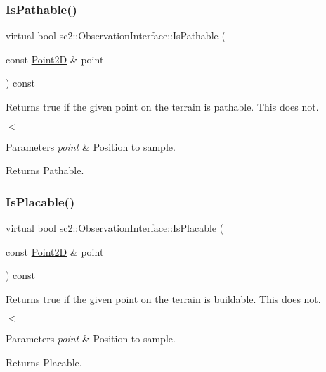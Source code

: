 \subsubsection{\texorpdfstring{Is\+Pathable()}{IsPathable()}}
{\footnotesize\ttfamily virtual bool sc2\+::\+Observation\+Interface\+::\+Is\+Pathable (\begin{DoxyParamCaption}\item[{const \hyperlink{structsc2_1_1_point2_d}{Point2D} \&}]{point }\end{DoxyParamCaption}) const\hspace{0.3cm}{\ttfamily [pure virtual]}}



Returns \textquotesingle{}true\textquotesingle{} if the given point on the terrain is pathable. This does not. 

$<$ 
\begin{DoxyParams}{Parameters}
{\em point} & Position to sample. \\
\hline
\end{DoxyParams}
\begin{DoxyReturn}{Returns}
Pathable. 
\end{DoxyReturn}
\mbox{\label{classsc2_1_1_observation_interface_aceb3be53ab7a68e268169e6f786e61f6}} 
\subsubsection{\texorpdfstring{Is\+Placable()}{IsPlacable()}}
{\footnotesize\ttfamily virtual bool sc2\+::\+Observation\+Interface\+::\+Is\+Placable (\begin{DoxyParamCaption}\item[{const \hyperlink{structsc2_1_1_point2_d}{Point2D} \&}]{point }\end{DoxyParamCaption}) const\hspace{0.3cm}{\ttfamily [pure virtual]}}



Returns \textquotesingle{}true\textquotesingle{} if the given point on the terrain is buildable. This does not. 

$<$ 
\begin{DoxyParams}{Parameters}
{\em point} & Position to sample. \\
\hline
\end{DoxyParams}
\begin{DoxyReturn}{Returns}
Placable. 
\end{DoxyReturn}
\mbox{\label{classsc2_1_1_observation_interface_a8e6d0c2bce48f675b3d4b99f925dfafb}} 
